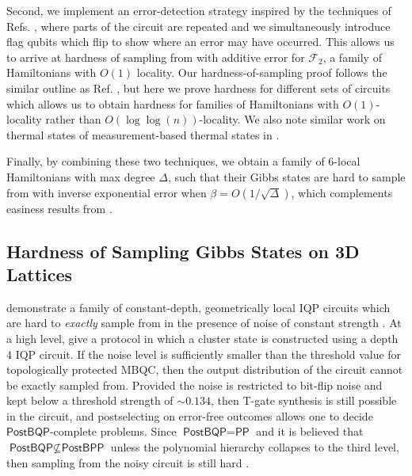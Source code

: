 \documentclass[a4paper,onecolumn,11pt,accepted=2017-05-09]{quantumarticle}
\begin{document}
    Second, we implement an error-detection strategy inspired by the techniques of Refs.
    \cite{Bremner_2017, bergamaschi2024sample}, where parts of the circuit are repeated and we simultaneously introduce flag qubits which flip to show where an error may have occurred.
    This allows us to arrive at hardness of sampling from with additive error for $\mathcal{F}_2$, a family of Hamiltonians with $O(1)$ locality.
    Our hardness-of-sampling proof follows the similar outline as Ref. \cite{bergamaschi2024sample}, but here we prove hardness for different sets of circuits which allows us to obtain hardness for families of Hamiltonians with $O(1)$-locality rather than $O(\log\log(n))$-locality. 
    We also note similar work on thermal states of measurement-based thermal states in \cite{fujii2015quantum}.
 
    Finally, by combining these two techniques, we obtain a family of $6$-local Hamiltonians with max degree $\Delta$, such that their Gibbs states are hard to sample from with inverse exponential error when $\beta = O(1/\sqrt{\Delta})$, which complements easiness results from \cite{bakshi2024high}.
    \color{black}
    

	
	\subsection{Hardness of Sampling Gibbs States on 3D Lattices}
 \label{Sec:Hardness_Exponential}

    \citeauthor{fujii2016computational} demonstrate a family of constant-depth, geometrically local IQP circuits which are hard to \textit{exactly} sample from in the presence of noise of constant strength \cite{fujii2016computational}. 
    At a high level, \citeauthor{fujii2016computational} give a protocol in which a cluster state is constructed using %
    a depth 4 IQP circuit. 
    If the noise level is sufficiently smaller than the threshold value for topologically protected MBQC, then the output distribution of the circuit cannot be exactly sampled from. 
     Provided the noise is restricted to bit-flip noise and kept below a threshold strength of $\sim 0.134$, then T-gate synthesis is still possible in the circuit,
     and postselecting on error-free outcomes allows one to decide $\textsf{PostBQP}$-complete problems. 
     Since $\textsf{PostBQP}=\textsf{PP}$ and it is believed that $\textsf{PostBQP}\not \subseteq\textsf{PostBPP} $ unless the polynomial hierarchy collapses to the third level, then sampling from the noisy circuit is still hard \cite{aaronson2005quantum}.
    
\end{document}
